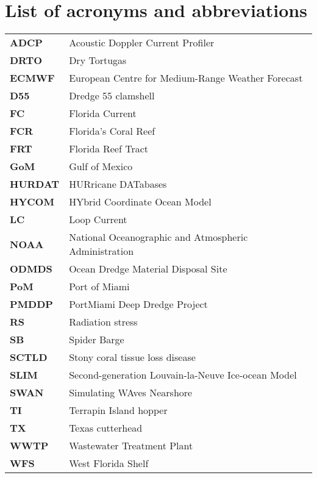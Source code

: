 
\chapter*{List of acronyms and abbreviations}

\begingroup
\setlength{\tabcolsep}{20pt}
\renewcommand{\arraystretch}{1.3}
\begin{tabular}{ll}
	\textbf{ADCP}   & Acoustic Doppler Current Profiler\\
	\textbf{DRTO}   & Dry Tortugas \\
	\textbf{ECMWF}  & European Centre for Medium-Range Weather Forecast \\
	\textbf{D55}    & Dredge 55 clamshell \\
	\textbf{FC}     & Florida Current \\
	\textbf{FCR}    & Florida's Coral Reef \\
	\textbf{FRT}    & Florida Reef Tract  \\
	\textbf{GoM}    & Gulf of Mexico \\
	\textbf{HURDAT} & HURricane DATabases \\
	\textbf{HYCOM}  & HYbrid Coordinate Ocean Model \\
	\textbf{LC}     & Loop Current \\
	\textbf{NOAA}   & National Oceanographic and Atmospheric Administration \\
	\textbf{ODMDS}	& Ocean Dredge Material Disposal Site \\
	\textbf{PoM}    & Port of Miami \\
	\textbf{PMDDP}  & PortMiami Deep Dredge Project \\
	\textbf{RS}     & Radiation stress \\
	\textbf{SB}     & Spider Barge \\
	\textbf{SCTLD}  & Stony coral tissue loss disease \\
	\textbf{SLIM}   & Second-generation Louvain-la-Neuve Ice-ocean Model\\
	\textbf{SWAN}   & Simulating WAves Nearshore \\
	\textbf{TI}     & Terrapin Island hopper \\
	\textbf{TX}     & Texas cutterhead \\
	\textbf{WWTP}	& Wastewater Treatment Plant \\
	\textbf{WFS}    & West Florida Shelf
\end{tabular}
\endgroup